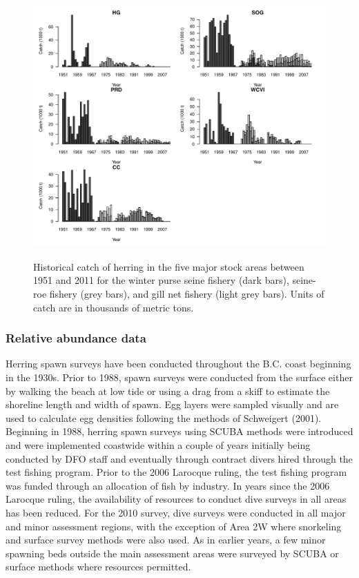 \begin{figure}[!tbp]
	\includegraphics[width=\textwidth]{../Figs/iscam_fig_CatchMajorAreas.pdf}\\
	\caption{Historical catch of herring in the five major stock areas between 1951 and 2011 for the winter purse seine fishery (dark bars), seine-roe fishery (grey bars), and gill net fishery (light grey bars). Units of catch are in thousands of metric tons.}\label{FigCatch}
\end{figure}
	
	\subsubsection{Relative abundance data}
Herring spawn surveys have been conducted throughout the B.C. coast beginning in the 1930s. Prior to 1988, spawn surveys were conducted from the surface either by walking the beach at low tide or using a drag from a skiff to estimate the shoreline length and width of spawn. Egg layers were sampled visually and are used to calculate egg densities following the methods of Schweigert (2001). Beginning in 1988, herring spawn surveys using SCUBA methods were introduced and were implemented coastwide within a couple of years initially being conducted by DFO staff and eventually through contract divers hired through the test fishing program. Prior to the 2006 Larocque ruling, the test fishing program was funded through an allocation of fish by industry. In years since the 2006 Larocque ruling, the availability of resources to conduct dive surveys in all areas has been reduced. For the 2010 survey, dive surveys were conducted in all major and minor assessment regions, with the exception of Area 2W where snorkeling and surface survey methods were also used. As in earlier years, a few minor spawning beds outside the main assessment areas were surveyed by SCUBA or surface methods where resources permitted.


